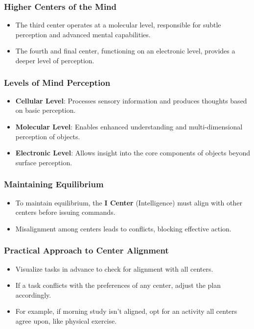 \begin{frame}[fragile]\frametitle{Higher Centers of the Mind}
    \begin{itemize}
        \item The third center operates at a molecular level, responsible for subtle perception and advanced mental capabilities.
        \item The fourth and final center, functioning on an electronic level, provides a deeper level of perception.
    \end{itemize}
\end{frame}

\begin{frame}[fragile]\frametitle{Levels of Mind Perception}
    \begin{itemize}
        \item \textbf{Cellular Level}: Processes sensory information and produces thoughts based on basic perception.
        \item \textbf{Molecular Level}: Enables enhanced understanding and multi-dimensional perception of objects.
        \item \textbf{Electronic Level}: Allows insight into the core components of objects beyond surface perception.
    \end{itemize}
\end{frame}

\begin{frame}[fragile]\frametitle{Maintaining Equilibrium}
    \begin{itemize}
        \item To maintain equilibrium, the \textbf{I Center} (Intelligence) must align with other centers before issuing commands.
        \item Misalignment among centers leads to conflicts, blocking effective action.
    \end{itemize}
\end{frame}

\begin{frame}[fragile]\frametitle{Practical Approach to Center Alignment}
    \begin{itemize}
        \item Visualize tasks in advance to check for alignment with all centers.
        \item If a task conflicts with the preferences of any center, adjust the plan accordingly.
        \item For example, if morning study isn’t aligned, opt for an activity all centers agree upon, like physical exercise.
    \end{itemize}
\end{frame}

